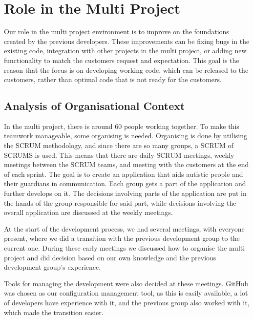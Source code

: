 \chapter{Role in the Multi Project}
Our role in the multi project environment is to improve on the foundations created by the previous developers.
These improvements can be fixing bugs in the existing code, integration with other projects in the multi project, or adding new functionality to match the customers request and expectation.
This goal is the reason that the focus is on developing working code, which can be released to the customers, rather than optimal code that is not ready for the customers.

\section{Analysis of Organisational Context}
In the multi project, there is around 60 people working together. 
To make this teamwork manageable, some organising is needed.
Organising is done by utilising the SCRUM methodology, and since there are so many groups, a SCRUM of SCRUMS is used.
This means that there are daily SCRUM meetings, weekly meetings between the SCRUM teams, and meeting with the customers at the end of each sprint.
The goal is to create an application that aids autistic people and their guardians in communication.
Each group gets a part of the application and further develops on it. 
The decisions involving parts of the application are put in the hands of the group responsible for said part, while decisions involving the overall application are discussed at the weekly meetings.

At the start of the development process, we had several meetings, with everyone present, where we did a transition with the previous development group to the current one.
During these early meetings we discussed how to organise the multi project and did decision based on our own knowledge and the previous development group's experience.

Tools for managing the development were also decided at these meetings.
GitHub was chosen as our configuration management tool, as this is easily available, a lot of developers have experience with it, and the previous group also worked with it, which made the transition easier.

